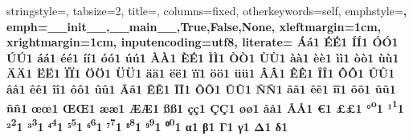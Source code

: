 {	stringstyle=\color{stringColor},              %
	tabsize=2,                                    %
	title=\lstname,                               %
	columns=fixed,                                %
	otherkeywords={self},                         %
	emphstyle=\color{customColor}\bfseries,       %
	emph={__init__,__main__,True,False,None},     %
	xleftmargin=1cm,                              %
	xrightmargin=1cm,                             %
	inputencoding=utf8,
	literate={%
	            {Á}{{\'a}}1 {É}{{\'E}}1 {Í}{{\'I}}1 {Ó}{{\'O}}1 {Ú}{{\'U}}1%
	            {á}{{\'a}}1 {é}{{\'e}}1 {í}{{\'i}}1 {ó}{{\'o}}1 {ú}{{\'u}}1%
	            {À}{{\`A}}1 {È}{{\'E}}1 {Ì}{{\`I}}1 {Ò}{{\`O}}1 {Ù}{{\`U}}1%
	            {à}{{\`a}}1 {è}{{\`e}}1 {ì}{{\`i}}1 {ò}{{\`o}}1 {ù}{{\`u}}1%
	            {Ä}{{\"A}}1 {Ë}{{\"E}}1 {Ï}{{\"I}}1 {Ö}{{\"O}}1 {Ü}{{\"U}}1%
	            {ä}{{\"a}}1 {ë}{{\"e}}1 {ï}{{\"i}}1 {ö}{{\"o}}1 {ü}{{\"u}}1%
	            {Â}{{\^A}}1 {Ê}{{\^E}}1 {Î}{{\^I}}1 {Ô}{{\^O}}1 {Û}{{\^U}}1%
	            {â}{{\^a}}1 {ê}{{\^e}}1 {î}{{\^i}}1 {ô}{{\^o}}1 {û}{{\^u}}1%
	            {Ã}{{\~a}}1 {Ẽ}{{\~E}}1 {Ĩ}{{\~I}}1 {Õ}{{\~O}}1 {Ũ}{{\~U}}1 {Ñ}{{\~N}}1%
	            {ã}{{\~a}}1 {ẽ}{{\~e}}1 {ĩ}{{\~i}}1 {õ}{{\~o}}1 {ũ}{{\~u}}1 {ñ}{{\~n}}1%
	            {œ}{{\oe}}1 {Œ}{{\OE}}1 {æ}{{\ae}}1 {Æ}{{\AE}}1 {ß}{{\ss}}1%
	            {ç}{{\c c}}1 {Ç}{{\c C}}1 {ø}{{\o}}1 {å}{{\r a}}1 {Å}{{\r A}}1%
	            {€}{{\EUR}}1 {£}{{\pounds}}1%
	            {°}{{\textsuperscript{o}}}1%
	            {¹}{{\textsuperscript{1}}}1%
	            {²}{{\textsuperscript{2}}}1%
	            {³}{{\textsuperscript{3}}}1%
	            {⁴}{{\textsuperscript{4}}}1%
	            {⁵}{{\textsuperscript{5}}}1%
	            {⁶}{{\textsuperscript{6}}}1%
	            {⁷}{{\textsuperscript{7}}}1%
	            {⁸}{{\textsuperscript{8}}}1%
	            {⁹}{{\textsuperscript{9}}}1%
	            {⁰}{{\textsuperscript{0}}}1%
	            {α}{{\textalpha}}1%
	            {β}{{\textbeta}}1%
	            {Γ}{{\textGamma}}1
	            {γ}{{\textgamma}}1%
	            {Δ}{{\textDelta}}1
	            {δ}{{\textdelta}}1%
}}
